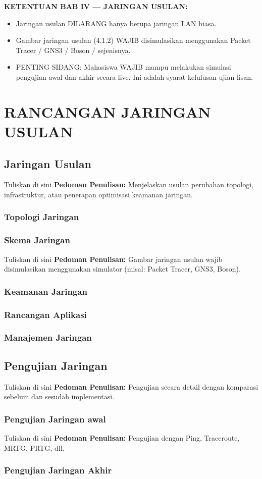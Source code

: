 \noindent\textbf{KETENTUAN BAB IV — JARINGAN USULAN:}
\begin{itemize}
    \item Jaringan usulan DILARANG hanya berupa jaringan LAN biasa.
    \item Gambar jaringan usulan (4.1.2) WAJIB disimulasikan menggunakan Packet Tracer / GNS3 / Boson / sejenisnya.
    \item PENTING SIDANG: Mahasiswa WAJIB mampu melakukan simulasi pengujian awal dan akhir secara live. Ini adalah syarat kelulusan ujian lisan.
\end{itemize}

\vspace{0.5cm}


\chapter{RANCANGAN JARINGAN USULAN}
\section{Jaringan Usulan}


Tuliskan di sini \textbf{Pedoman Penulisan:} Menjelaskan usulan perubahan topologi, infrastruktur, atau penerapan optimisasi keamanan jaringan.


\subsection{Topologi Jaringan}
\subsection{Skema Jaringan}


Tuliskan di sini \textbf{Pedoman Penulisan:} Gambar jaringan usulan wajib disimulasikan menggunakan simulator (misal: Packet Tracer, GNS3, Boson).


\subsection{Keamanan Jaringan}
\subsection{Rancangan Aplikasi}
\subsection{Manajemen Jaringan}
\section{Pengujian Jaringan}


Tuliskan di sini \textbf{Pedoman Penulisan:} Pengujian secara detail dengan komparasi sebelum dan sesudah implementasi.


\subsection{Pengujian Jaringan awal}


Tuliskan di sini \textbf{Pedoman Penulisan:} Pengujian dengan Ping, Traceroute, MRTG, PRTG, dll.


\subsection{Pengujian Jaringan Akhir}
